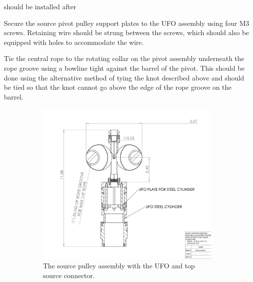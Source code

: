 \documentclass[11pt]{article}
\begin{document}
\begin{answerlist}
  should be installed after
\item Secure the source pivot pulley support plates to the UFO assembly using four M3 screws. Retaining wire should be strung between the screws, which should also be equipped with holes to accommodate the wire. 
\item Tie the central rope to the rotating collar on the pivot
  assembly underneath the rope groove using a bowline tight against
  the barrel of the pivot. This should be done using the alternative
  method of tying the knot described above and should be tied so that the knot cannot go above the edge of the rope groove on the barrel.
\end{answerlist}

\begin{figure}
  \begin{subfigure}{0.5\textwidth}
  \includegraphics[width=\textwidth]{UFOPivotSourceConnector}
  \caption{The source pulley assembly with the UFO and top source connector.}
  \label{fig:Pivot}
\end{subfigure}
\begin{subfigure}{0.45\textwidth}

\end{subfigure}
\end{figure}
\end{document}

